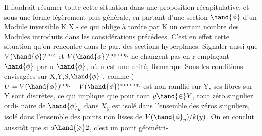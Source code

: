  Il faudrait résumer  toute cette situation dans une proposition
récapitulative, et sous une forme légèrement plus générale, en partant
d'une section $\hand{\phi}$ d'un \uline{Module inversible}  K  X - ce qui oblige
à tordre par K un certain nombre des Modules introduits dans les
considérations précédees. C'est en effet  cette situation qu'on
rencontre  dans le par. des sections hyperplanes. Signaler aussi que
 $V(\hand{\phi})^{\text{sing}}$  et $V(\hand{\phi})^{\text{sup sing}}$ ne changent pas en r emplaçant $\hand{\phi}$ par u $\hand{\phi}$,
où u est une unité, 
\uline{Remarque} Sous les conditions envisagées sur X,Y,S,$\hand{\phi}$ , comme )
$U = V(\hand{\phi})^{\text{sing}}- V(\hand{\phi})^{\text{sup sing}}$ est non ramffié sur Y, ses fibres sur Y sont
discrètes, ce qui implique que pour tout $y\hand{\in} Y$, tout zéro singulier ordi-%
naire de $\hand{\phi}_y$ dans $X_y$ est isolé dans l'ensemble des zéros singuliers, 
 isolé dans l'ensemble des points non lisses de $V(\hand{\phi}_y)/k(y)$.
 On en conclut  aussitôt que si $d\hand{\geqslant} 2$, c'est un point géométri-%

